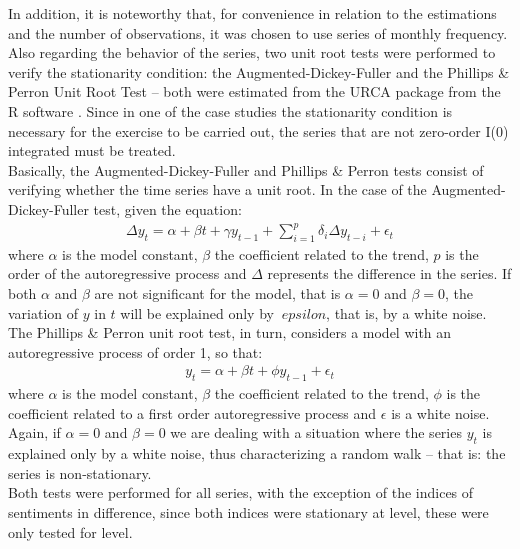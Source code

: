 In addition, it is noteworthy that, for convenience in relation to the estimations and the number of observations, it was chosen to use series of monthly frequency.\\

Also regarding the behavior of the series, two unit root tests were performed to verify the stationarity condition: the Augmented-Dickey-Fuller \cite[]{cheung1995lag} and the Phillips \& Perron Unit Root Test \cite[]{phillips1988testing} -- both were estimated from the URCA package \cite[]{urcacran} from the R software \cite[]{rcran}. Since in one of the case studies the stationarity condition is necessary for the exercise to be carried out, the series that are not zero-order I(0) integrated must be treated.\\

Basically, the Augmented-Dickey-Fuller and Phillips \& Perron tests consist of verifying whether the time series have a unit root. In the case of the Augmented-Dickey-Fuller test, given the equation:
\begin{align}
    \Delta y_t = \alpha + \beta t + \gamma y_{t-1} + \sum_{i=1}^{p} \delta_i \Delta y_{t-i} + \epsilon_t
\end{align}
where $\alpha$ is the model constant, $\beta$ the coefficient related to the trend, $p$ is the order of the autoregressive process and $\Delta$ represents the difference in the series. If both $\alpha$ and $\beta$ are not significant for the model, that is $\alpha = 0$ and $\beta = 0$, the variation of $y$ in $t$ will be explained only by $\ epsilon$, that is, by a white noise.\\

The Phillips \& Perron unit root test, in turn, considers a model with an autoregressive process of order 1, so that:
\begin{align}
    y_t = \alpha + \beta t + \phi y_{t-1} + \epsilon_t
\end{align}
where $\alpha$ is the model constant, $\beta$ the coefficient related to the trend, $\phi$ is the coefficient related to a first order autoregressive process and $\epsilon$ is a white noise. Again, if $\alpha=0$ and $\beta = 0$ we are dealing with a situation where the series $y_t$ is explained only by a white noise, thus characterizing a random walk -- that is: the series is non-stationary. \\

Both tests were performed for all series, with the exception of the indices of sentiments in difference, since both indices were stationary at level, these were only tested for level. 


